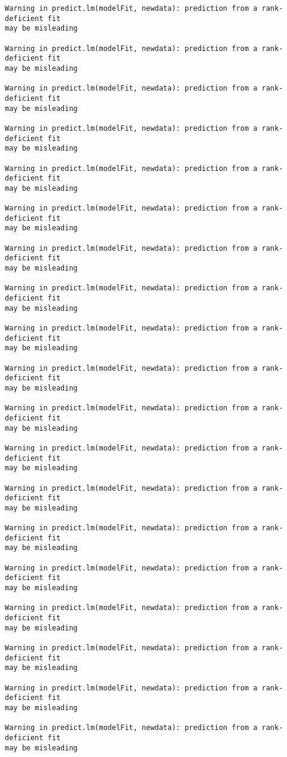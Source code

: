 \documentclass[
  letterpaper,
  DIV=11,
  numbers=noendperiod]{scrartcl}
\begin{document}
\begin{verbatim}
Warning in predict.lm(modelFit, newdata): prediction from a rank-deficient fit
may be misleading

Warning in predict.lm(modelFit, newdata): prediction from a rank-deficient fit
may be misleading

Warning in predict.lm(modelFit, newdata): prediction from a rank-deficient fit
may be misleading

Warning in predict.lm(modelFit, newdata): prediction from a rank-deficient fit
may be misleading

Warning in predict.lm(modelFit, newdata): prediction from a rank-deficient fit
may be misleading

Warning in predict.lm(modelFit, newdata): prediction from a rank-deficient fit
may be misleading

Warning in predict.lm(modelFit, newdata): prediction from a rank-deficient fit
may be misleading

Warning in predict.lm(modelFit, newdata): prediction from a rank-deficient fit
may be misleading

Warning in predict.lm(modelFit, newdata): prediction from a rank-deficient fit
may be misleading

Warning in predict.lm(modelFit, newdata): prediction from a rank-deficient fit
may be misleading

Warning in predict.lm(modelFit, newdata): prediction from a rank-deficient fit
may be misleading

Warning in predict.lm(modelFit, newdata): prediction from a rank-deficient fit
may be misleading

Warning in predict.lm(modelFit, newdata): prediction from a rank-deficient fit
may be misleading

Warning in predict.lm(modelFit, newdata): prediction from a rank-deficient fit
may be misleading

Warning in predict.lm(modelFit, newdata): prediction from a rank-deficient fit
may be misleading

Warning in predict.lm(modelFit, newdata): prediction from a rank-deficient fit
may be misleading

Warning in predict.lm(modelFit, newdata): prediction from a rank-deficient fit
may be misleading

Warning in predict.lm(modelFit, newdata): prediction from a rank-deficient fit
may be misleading

Warning in predict.lm(modelFit, newdata): prediction from a rank-deficient fit
may be misleading


\end{verbatim}
\end{document}
